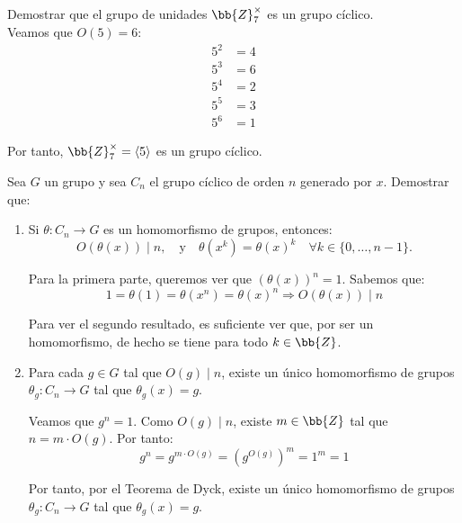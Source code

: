\begin{ejercicio}\label{ej:3.16}
    Demostrar que el grupo de unidades $\bb{Z}_7^\times$ es un grupo cíclico.\\

    Veamos que $O(5)=6$:
    \begin{align*}
        5^2 &= 4\\
        5^3 &= 6\\
        5^4 &= 2\\
        5^5 &= 3\\
        5^6 &= 1
    \end{align*}

    Por tanto, $\bb{Z}_7^\times = \langle 5\rangle$ es un grupo cíclico.
\end{ejercicio}

\begin{ejercicio}\label{ej:3.17}
    Sea $G$ un grupo y sea $C_n$ el grupo cíclico de orden $n$ generado por $x$. Demostrar que:
    \begin{enumerate}
        \item Si $\theta : C_n \to G$ es un homomorfismo de grupos, entonces:
        \begin{equation*}
            O(\theta(x))\mid n, \quad \text{y} \quad \theta(x^k) = \theta(x)^k \quad \forall k \in \{0, \ldots, n - 1\}.
        \end{equation*}

        Para la primera parte, queremos ver que $(\theta(x))^n=1$. Sabemos que:
        \begin{equation*}
            1 = \theta(1) = \theta(x^n) = \theta(x)^n\Longrightarrow
            O(\theta(x))\mid n
        \end{equation*}

        Para ver el segundo resultado, es suficiente ver que, por ser un homomorfismo, de hecho se tiene para todo $k\in \bb{Z}$. 

        \item Para cada $g \in G$ tal que $O(g) \mid n$, existe un único homomorfismo de grupos $\theta_g : C_n \to G$ tal que $\theta_g(x) = g$.
        
        Veamos que $g^n=1$. Como $O(g)\mid n$, existe $m\in \bb{Z}$ tal que $n=m\cdot O(g)$. Por tanto:
        \begin{equation*}
            g^n = g^{m\cdot O(g)} = (g^{O(g)})^m = 1^m = 1
        \end{equation*}

        Por tanto, por el Teorema de Dyck, existe un único homomorfismo de grupos $\theta_g : C_n \to G$ tal que $\theta_g(x) = g$.
        

\end{enumerate}
\end{ejercicio}
